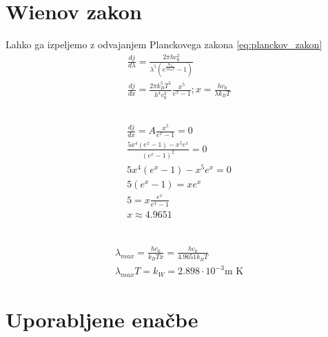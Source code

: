 \documentclass[a4paper,12pt]{article}
\begin{document}
\section{Wienov zakon}
Lahko ga izpeljemo z odvajanjem Planckovega zakona \ref{eq:planckov_zakon}
\begin{align}
    \frac{dj}{d\lambda} = \frac{2 \pi hc_0^2}{\lambda^5\left(e^{\frac{hc_0}{\lambda k_B T}} - 1\right)} \\
    \frac{dj}{dx}= \frac{2 \pi k_B^5 T^5}{h^4 c_0^3} \frac{x^5}{e^x - 1}; x = \frac{hc_0}{\lambda k_B T}
\end{align}

\subsection{}
\begin{align}
    \frac{dj}{dx} = A \frac{x^5}{e^x - 1} = 0 \\
    \frac{5x^4 (e^x - 1) - x^5 e^x}{(e^x - 1)^2} = 0 \\
    5x^4 (e^x - 1) - x^5 e^x = 0 \\
    5(e^x - 1) = x e^x \\
    5 = x \frac{e^x}{e^x - 1} \\
    x \approx 4.9651\\
\end{align}

\subsection{}
\begin{align}
    \lambda_{max} = \frac{hc_0}{k_B T x} = \frac{hc_0}{4.9651 k_B T} \\
    \lambda_{max} T = k_W = 2.898 \cdot 10^{-3} \text{m K}
\end{align}


\newpage
\section{Uporabljene enačbe}
\end{document}
